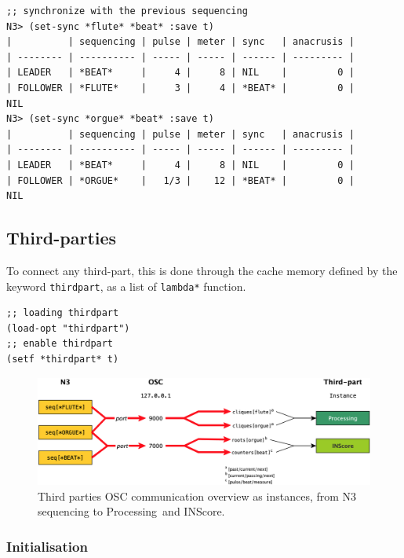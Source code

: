 \documentclass{article}
\begin{document}
\begin{lstlisting}[language=N3,basicstyle=\ttfamily\footnotesize]
;; synchronize with the previous sequencing
N3> (set-sync *flute* *beat* :save t)
|          | sequencing | pulse | meter | sync   | anacrusis |
| -------- | ---------- | ----- | ----- | ------ | --------- |
| LEADER   | *BEAT*     |     4 |     8 | NIL    |         0 |
| FOLLOWER | *FLUTE*    |     3 |     4 | *BEAT* |         0 |
NIL
N3> (set-sync *orgue* *beat* :save t)
|          | sequencing | pulse | meter | sync   | anacrusis |
| -------- | ---------- | ----- | ----- | ------ | --------- |
| LEADER   | *BEAT*     |     4 |     8 | NIL    |         0 |
| FOLLOWER | *ORGUE*    |   1/3 |    12 | *BEAT* |         0 |
NIL
\end{lstlisting}

\subsection{Third-parties}
\addtocounter{footnote}{-2}

To connect any third-part, this is done through the cache memory defined by the keyword \texttt{thirdpart}, as a list of \texttt{lambda*} function. 

\begin{lstlisting}[language=N3]
;; loading thirdpart 
(load-opt "thirdpart")
;; enable thirdpart
(setf *thirdpart* t)
\end{lstlisting}

\begin{figure}[h]
\centering
\includegraphics[width=\textwidth]{../img/9910}
\caption{Third parties OSC communication overview as instances, from N3 sequencing to Processing\protect\footnotemark \, and INScore\protect\footnotemark.}
\end{figure}
\addtocounter{footnote}{-1}

\subsubsection{Initialisation}
\end{document}
